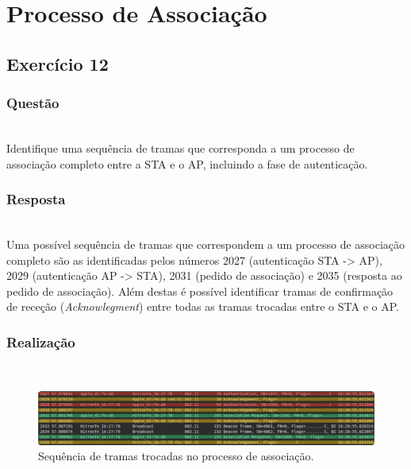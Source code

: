 \documentclass{llncs}
\begin{document}
\clearpage

\section{Processo de Associação}
\subsection{Exercício 12}
\subsubsection{Questão}\rule[-10pt]{0pt}{10pt}\\

Identifique uma sequência de tramas que corresponda a um processo de associação completo entre a STA e o AP, incluindo a fase de autenticação.

\subsubsection{Resposta}\rule[-10pt]{0pt}{10pt}\\

Uma possível sequência de tramas que correspondem a um processo de associação completo são as identificadas pelos números 2027 (autenticação STA -> AP), 2029 (autenticação AP -> STA), 2031 (pedido de associação) e 2035 (resposta ao pedido de associação). Além destas é possível identificar tramas de confirmação de receção (\textit{Acknowlegment}) entre todas as tramas trocadas entre o STA e o AP.

\subsubsection{Realização}\rule[-10pt]{0pt}{10pt}\\

\begin{figure}
  \begin{center}
  \includegraphics[scale=0.35]{./imagens/assoc_seq.png} 
  \end{center}
  \caption{Sequência de tramas trocadas no processo de associação.}
  \label{fig:assoc_seq}
\end{figure}
\end{document}

